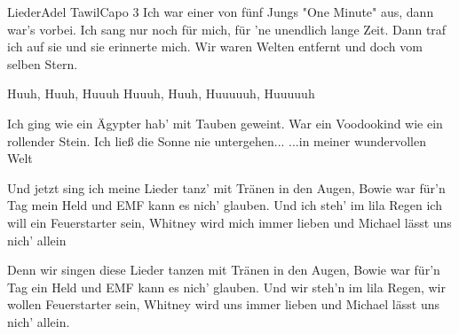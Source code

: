 \begin{song}{Lieder}{Adel Tawil}{Capo 3}
Ich war einer von fünf Jungs "One Minute" aus, dann war's vorbei.
Ich sang nur noch für mich, für 'ne unendlich lange Zeit.
Dann traf ich auf sie und sie erinnerte mich.
Wir waren Welten entfernt und doch vom selben Stern.

   Huuh, Huuh, Huuuh Huuuh, Huuh, Huuuuuh, Huuuuuh

     Ich ging wie ein Ägypter hab' mit Tauben geweint.
     War ein Voodookind wie ein rollender Stein.
     Ich ließ die Sonne nie untergehen...
  ...in meiner wundervollen Welt

Und jetzt sing ich meine Lieder tanz' mit Tränen in den Augen,
Bowie war für'n Tag mein Held und EMF kann es nich' glauben.
Und ich steh' im lila Regen ich will ein Feuerstarter sein,
Whitney wird mich immer lieben und Michael lässt uns nich' allein

Denn wir singen diese Lieder tanzen mit Tränen in den Augen,
Bowie war für'n Tag ein Held und EMF kann es nich' glauben.
Und wir steh'n im lila Regen, wir wollen  Feuerstarter sein,
Whitney wird uns immer lieben und Michael lässt uns nich' allein.
\end{song}
